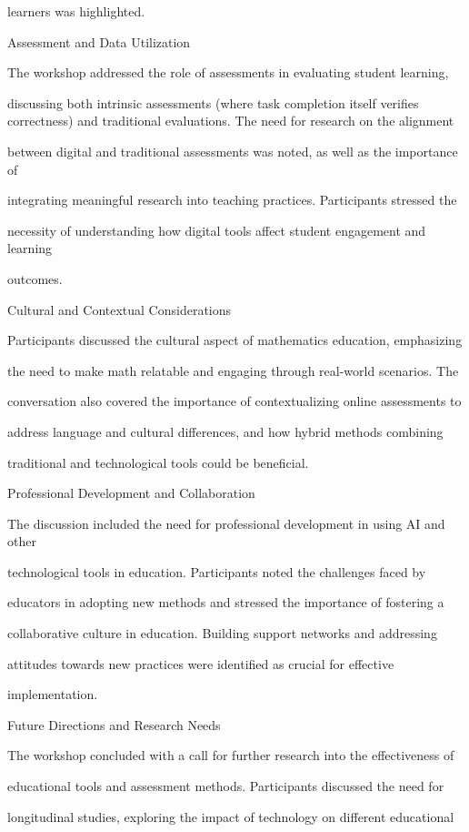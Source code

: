 \documentclass[11pt]{article}
\begin{document}
learners was highlighted.

Assessment and Data Utilization

The workshop addressed the role of assessments in evaluating student learning,

discussing both intrinsic assessments (where task completion itself verifies correctness) and traditional evaluations. The need for research on the alignment

between digital and traditional assessments was noted, as well as the importance of

integrating meaningful research into teaching practices. Participants stressed the

necessity of understanding how digital tools affect student engagement and learning

outcomes.

Cultural and Contextual Considerations

Participants discussed the cultural aspect of mathematics education, emphasizing

the need to make math relatable and engaging through real-world scenarios. The

conversation also covered the importance of contextualizing online assessments to

address language and cultural differences, and how hybrid methods combining

traditional and technological tools could be beneficial.

Professional Development and Collaboration

The discussion included the need for professional development in using AI and other

technological tools in education. Participants noted the challenges faced by

educators in adopting new methods and stressed the importance of fostering a

collaborative culture in education. Building support networks and addressing

attitudes towards new practices were identified as crucial for effective

implementation.

Future Directions and Research Needs

The workshop concluded with a call for further research into the effectiveness of

educational tools and assessment methods. Participants discussed the need for

longitudinal studies, exploring the impact of technology on different educational
\end{document}
